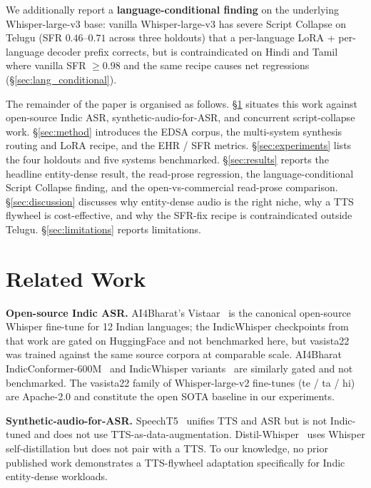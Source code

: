 \documentclass[conference,a4paper]{IEEEtran}
\begin{document}
We additionally report a \textbf{language-conditional finding} on the underlying Whisper-large-v3 base: vanilla Whisper-large-v3 has severe Script Collapse on Telugu (SFR $0.46$--$0.71$ across three holdouts) that a per-language LoRA + per-language decoder prefix corrects, but is contraindicated on Hindi and Tamil where vanilla SFR $\geq 0.98$ and the same recipe causes net regressions (\S\ref{sec:lang_conditional}).

The remainder of the paper is organised as follows. \S\ref{sec:related} situates this work against open-source Indic ASR, synthetic-audio-for-ASR, and concurrent script-collapse work. \S\ref{sec:method} introduces the EDSA corpus, the multi-system synthesis routing and LoRA recipe, and the EHR / SFR metrics. \S\ref{sec:experiments} lists the four holdouts and five systems benchmarked. \S\ref{sec:results} reports the headline entity-dense result, the read-prose regression, the language-conditional Script Collapse finding, and the open-vs-commercial read-prose comparison. \S\ref{sec:discussion} discusses why entity-dense audio is the right niche, why a TTS flywheel is cost-effective, and why the SFR-fix recipe is contraindicated outside Telugu. \S\ref{sec:limitations} reports limitations.

\section{Related Work}\label{sec:related}

\textbf{Open-source Indic ASR.}
AI4Bharat's Vistaar~\cite{vistaar_2023} is the canonical open-source Whisper fine-tune for 12 Indian languages; the IndicWhisper checkpoints from that work are gated on HuggingFace and not benchmarked here, but vasista22 was trained against the same source corpora at comparable scale.
AI4Bharat IndicConformer-600M~\cite{ai4bharat_indicconformer} and IndicWhisper variants~\cite{ai4bharat_indicwhisper} are similarly gated and not benchmarked.
The vasista22 family of Whisper-large-v2 fine-tunes \cite{vasista22} (te / ta / hi) are Apache-2.0 and constitute the open SOTA baseline in our experiments.

\textbf{Synthetic-audio-for-ASR.}
SpeechT5~\cite{speech_t5} unifies TTS and ASR but is not Indic-tuned and does not use TTS-as-data-augmentation.
Distil-Whisper~\cite{distil_whisper} uses Whisper self-distillation but does not pair with a TTS.
To our knowledge, no prior published work demonstrates a TTS-flywheel adaptation specifically for Indic entity-dense workloads.
\end{document}
